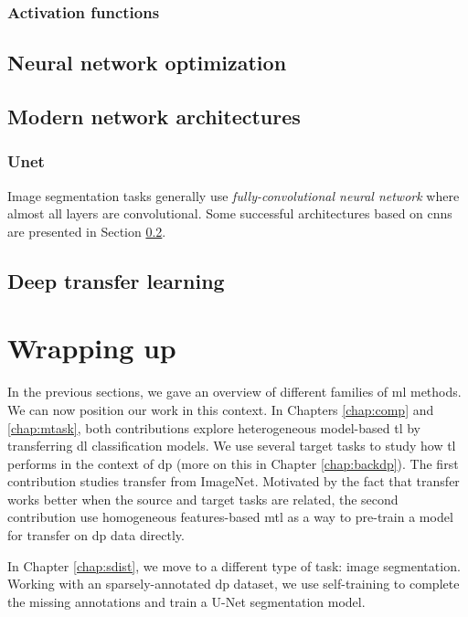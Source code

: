 \subsubsection{Activation functions}
\label{sssec:backml:activationfn}    


\subsection{Neural network optimization}
\label{ssec:backml:dl:opti}

\subsection{Modern network architectures}
\label{ssec:backml:dl:modernarchi}

\subsubsection{Unet}

Image segmentation tasks generally use \textit{fully-convolutional neural network} where almost all layers are convolutional. Some successful architectures based on \acrshort{cnn}s are presented in Section \ref{ssec:backml:dl:modernarchi}. 


\subsection{Deep transfer learning}
\label{ssec:backml:dl:deeptransfer}


\section{Wrapping up}

In the previous sections, we gave an overview of different families of \acrlong{ml} methods. We can now position our work in this context. In Chapters \ref{chap:comp} and \ref{chap:mtask}, both contributions explore heterogeneous model-based \acrlong{tl} by transferring \acrlong{dl} classification models. We use several target tasks to study how \acrlong{tl} performs in the context of \acrlong{dp} (more on this in Chapter \ref{chap:backdp}). The first contribution studies transfer from ImageNet. Motivated by the fact that transfer works better when the source and target tasks are related, the second contribution use homogeneous features-based \acrlong{mtl} as a way to pre-train a model for transfer on \acrlong{dp} data directly.

In Chapter \ref{chap:sdist}, we move to a different type of task: image segmentation. Working with an sparsely-annotated \acrlong{dp} dataset, we use self-training to complete the missing annotations and train a U-Net segmentation model.  

